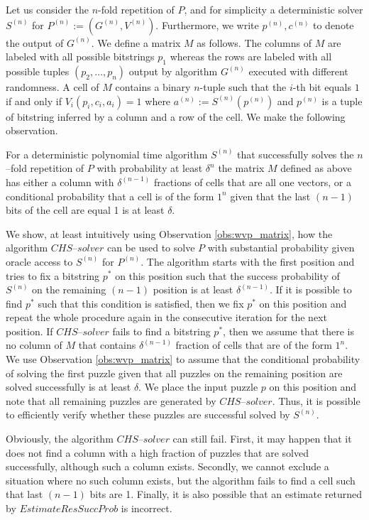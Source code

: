 Let us consider the $n$-fold repetition of $P$, and for simplicity a deterministic solver $S^{(n)}$ for $P^{(n)} := (G^{(n)}, V^{(n)})$.
Furthermore, we write $p^{(n)}, c^{(n)}$ to denote the output of $G^{(n)}$.
We define a matrix $M$ as follows. The columns of $M$ are labeled with all possible bitstrings $p_1$
whereas the rows are labeled with all possible tuples $(p_2, \dotsc, p_n)$ output by algorithm $G^{(n)}$
executed with different randomness.
A cell of $M$ contains a binary $n$-tuple such that the $i$-th bit equals $1$ if and only if $V_i(p_i, c_i, a_i) = 1$ where
 $a^{(n)} := S^{(n)}(p^{(n)})$ and $p^{(n)}$ is a tuple of bitstring inferred by a column and a row of the cell.
We make the following observation.
%
\begin{observation}
\label{obs:wvp_matrix}
For a deterministic polynomial time algorithm $S^{(n)}$ that successfully solves the $n$--fold repetition of $P$ with probability at least $\delta^{n}$
the matrix $M$ defined as above has either a column with $\delta^{(n-1)}$ fractions of cells that are all one vectors, or
a conditional probability that a cell is of the form $1^n$ given that the last $(n-1)$ bits of the cell are equal 1 is at least $\delta$.
\end{observation}
%
We show, at least intuitively using Observation \ref{obs:wvp_matrix}, how the algorithm $\mathit{CHS\text{--}solver}$ can be used to solve $P$
with substantial probability given oracle access to $S^{(n)}$ for $P^{(n)}$.
The algorithm starts with the first position and tries to fix a bitstring $p^*$ on this position such that the success probability of $S^{(n)}$ on the remaining $(n-1)$
position is at least $\delta^{(n-1)}$. If it is possible to find $p^*$ such that this condition is satisfied, then we fix $p^*$
on this position and repeat the whole procedure again in the consecutive iteration for the next position.
If $\mathit{CHS\text{--}solver}$ fails to find a bitstring $p^*$, then we assume that there is no column of $M$ that contains $\delta^{(n-1)}$ fraction
of cells that are of the form $1^n$. We use Observation \ref{obs:wvp_matrix} to assume that the conditional probability of
solving the first puzzle given that all puzzles on the remaining position are solved successfully is at least $\delta$.
We place the input puzzle $p$ on this position and note that all remaining puzzles are generated by $\mathit{CHS\text{--}solver}$.
Thus, it is possible to efficiently verify whether these puzzles are successful solved by $S^{(n)}$.

Obviously, the algorithm $\mathit{CHS\text{--}solver}$ can still fail. First, it may happen that it does not find a column
with a high fraction of puzzles that are solved successfully, although such a column exists.
Secondly, we cannot exclude a situation where no such column exists, but the algorithm fails to find a cell such that last $(n\!-\!1)$ bits are 1.
Finally, it is also possible that an estimate returned by $\mathit{EstimateResSuccProb}$ is incorrect.

